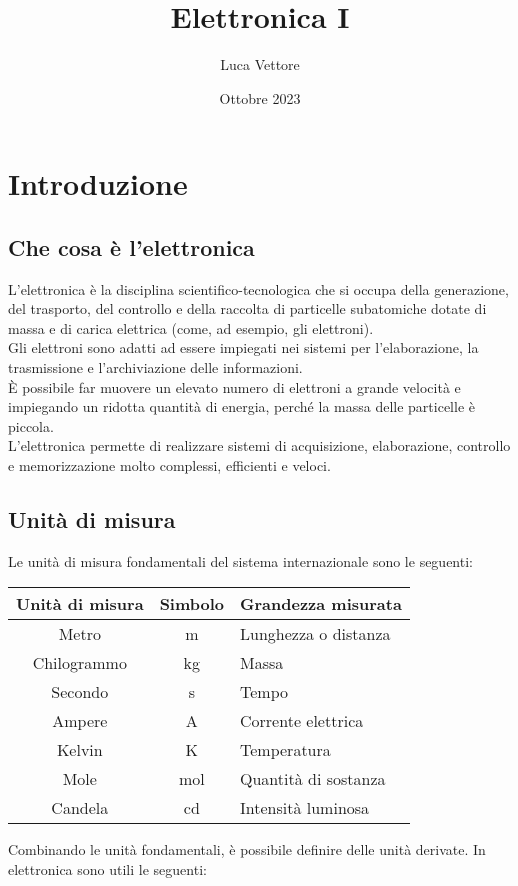 \documentclass{article}
\title{Elettronica I}
\author{Luca Vettore}
\date{Ottobre 2023}
\begin{document}


\maketitle

\section{Introduzione}

\subsection{Che cosa è l'elettronica}
L’elettronica è la disciplina scientifico-tecnologica che si occupa della
generazione, del trasporto, del controllo e della raccolta di particelle
subatomiche dotate di massa e di carica elettrica (come, ad esempio, gli
elettroni).\\
Gli elettroni sono adatti ad essere impiegati nei sistemi per l’elaborazione, la
trasmissione e l’archiviazione delle informazioni.\\
È possibile far muovere un elevato numero di elettroni a grande velocità e
impiegando un ridotta quantità di energia, perché la massa delle particelle è
piccola.\\
L’elettronica permette di realizzare sistemi di acquisizione, elaborazione, controllo
e memorizzazione molto complessi, efficienti e veloci.

\subsection{Unità di misura}
Le unità di misura fondamentali del sistema internazionale sono le seguenti:

\begin{center}
\begin{tabular}{|c|c|p{6cm}|}
\hline
\textbf{Unità di misura} & \textbf{Simbolo} & \textbf{Grandezza misurata} \\
\hline
Metro & m & Lunghezza o distanza \\
Chilogrammo & kg & Massa \\
Secondo & s & Tempo \\
Ampere & A & Corrente elettrica \\
Kelvin & K & Temperatura \\
Mole & mol & Quantità di sostanza \\
Candela & cd & Intensità luminosa \\
\hline
\end{tabular}
\end{center}
Combinando le unità fondamentali, è possibile definire delle unità derivate. In elettronica sono utili le seguenti:
\end{document}
